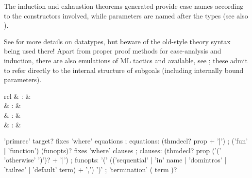 \begin{isabellebody}
\begin{isamarkuptext}
\begin{descr}
  \end{descr}

  The induction and exhaustion theorems generated provide case names
  according to the constructors involved, while parameters are named
  after the types (see also ).

  See \cite{isabelle-HOL} for more details on datatypes, but beware of
  the old-style theory syntax being used there!  Apart from proper
  proof methods for case-analysis and induction, there are also
  emulations of ML tactics \hyperlink{method.HOL.case-tac}{\mbox{}} and \hyperlink{method.HOL.induct-tac}{\mbox{}} available, see ; these admit
  to refer directly to the internal structure of subgoals (including
  internally bound parameters).%
\end{isamarkuptext}%
\isamarkuptrue%
%
\isamarkuptrue%
%
\begin{isamarkuptext}%
\begin{matharray}{rcl}
    \hypertarget{command.HOL.primrec}{\hyperlink{command.HOL.primrec}{\mbox{}}} & : &  \\
    \hypertarget{command.HOL.fun}{\hyperlink{command.HOL.fun}{\mbox{}}} & : &  \\
    \hypertarget{command.HOL.function}{\hyperlink{command.HOL.function}{\mbox{}}} & : &  \\
    \hypertarget{command.HOL.termination}{\hyperlink{command.HOL.termination}{\mbox{}}} & : &  \\
  \end{matharray}


  \begin{rail}
    'primrec' target? fixes 'where' equations
    ;
    equations: (thmdecl? prop + '|')
    ;
    ('fun' | 'function') (funopts)? fixes 'where' clauses
    ;
    clauses: (thmdecl? prop ('(' 'otherwise' ')')? + '|')
    ;
    funopts: '(' (('sequential' | 'in' name | 'domintros' | 'tailrec' |
    'default' term) + ',') ')'
    ;
    'termination' ( term )?
  \end{rail}


\end{isamarkuptext}
\end{isabellebody}
